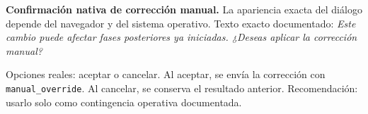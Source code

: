 \begin{operacionsensible}
\textbf{Confirmación nativa de corrección manual.}
La apariencia exacta del diálogo depende del navegador y del sistema operativo. Texto exacto documentado:
\emph{Este cambio puede afectar fases posteriores ya iniciadas. ¿Deseas aplicar la corrección manual?}

Opciones reales: aceptar o cancelar. Al aceptar, se envía la corrección con \texttt{manual\_override}. Al cancelar, se conserva el resultado anterior. Recomendación: usarlo solo como contingencia operativa documentada.
\end{operacionsensible}

